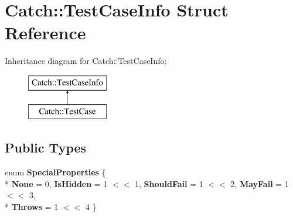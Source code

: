 \hypertarget{structCatch_1_1TestCaseInfo}{}\section{Catch\+:\+:Test\+Case\+Info Struct Reference}
\label{structCatch_1_1TestCaseInfo}
Inheritance diagram for Catch\+:\+:Test\+Case\+Info\+:\begin{figure}[H]
\begin{center}
\leavevmode
\includegraphics[height=2.000000cm]{structCatch_1_1TestCaseInfo}
\end{center}
\end{figure}
\subsection*{Public Types}
\begin{DoxyCompactItemize}
\item 
enum {\bfseries Special\+Properties} \{ \\*
{\bfseries None} = 0, 
{\bfseries Is\+Hidden} = 1 $<$$<$ 1, 
{\bfseries Should\+Fail} = 1 $<$$<$ 2, 
{\bfseries May\+Fail} = 1 $<$$<$ 3, 
\\*
{\bfseries Throws} = 1 $<$$<$ 4
 \}\hypertarget{structCatch_1_1TestCaseInfo_a39b232f74b4a7a6f2183b96759027eac}{}\label{structCatch_1_1TestCaseInfo_a39b232f74b4a7a6f2183b96759027eac}

\end{DoxyCompactItemize}
